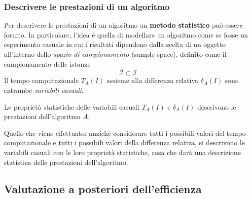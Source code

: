 \documentclass{article}
\begin{document}
\subsubsection{Descrivere le prestazioni di un algoritmo}
Per descrivere le prestazioni di un algoritmo un \textbf{metodo statistico} può essere
fornito. In particolare, l'idea è quella di modellare un algoritmo come se fosse un
esperimento casuale in cui i risultati dipendono dalla scelta di un oggetto
all'interno dello \textit{spazio di campionamento} (sample space), definito come
il campionamento delle istanze
$$\overline{\mathcal{I}}\subset \mathcal{I}$$
Il tempo computazionale $T_A(I)$ assieme alla differenza relativa $\delta_A(I)$
sono entrambe \textit{variabili casuali}.

Le proprietà statistiche delle variabili casuali $T_A(I)$ e $\delta_A(I)$ descrivono
le prestazioni dell'algoritmo $A$.

Quello che viene effettuato: anzichè considerare tutti i possibili valori del tempo
computazionale e tutti i possibili valori della differenza relativa, si descrivono
le variabili casuali con le loro proprietà statistiche, cosa che darà una descrizione
statistica delle prestazioni dell'algoritmo.

\subsection{Valutazione a posteriori dell'efficienza}
\end{document}

